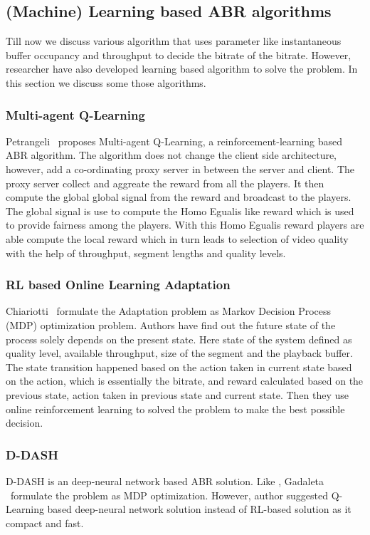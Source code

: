 \subsection{(Machine) Learning based ABR algorithms}
Till now we discuss various algorithm that uses parameter like instantaneous buffer occupancy and throughput to decide the bitrate of the bitrate. However, researcher have also developed learning based algorithm to solve the problem. In this section we discuss some those algorithms.

\subsubsection{Multi-agent Q-Learning}
Petrangeli \etal\ proposes Multi-agent Q-Learning\cite{6838245}, a reinforcement-learning based ABR algorithm. The algorithm does not change the client side architecture, however, add a co-ordinating proxy server in between the server and client. The proxy server collect and aggreate the reward from all the players. It then compute the global global signal from the reward and broadcast to the players. The global signal is use to compute the Homo Egualis \cite{10.5555/1402298.1402344} like reward which is used to provide fairness among the players. With this Homo Egualis reward players are able compute the local reward which in turn leads to selection of video quality with the help of throughput, segment lengths and quality levels.

\subsubsection{RL based Online Learning Adaptation}
Chiariotti \etal\ formulate the Adaptation problem as Markov Decision Process (MDP)\cite{P-1066} optimization problem\cite{10.1145/2910017.2910603}. Authors have find out the future state of the process solely depends on the present state. Here state of the system defined as quality level, available throughput, size of the segment and the playback buffer. The state transition happened based on the action taken in current state based on the action, which is essentially the bitrate, and reward calculated based on the previous state, action taken in previous state and current state. Then they use online reinforcement learning to solved the problem to make the best possible decision.

\subsubsection{D-DASH \cite{8048013}}
D-DASH\cite{8048013} is an deep-neural network based ABR solution. Like \cite{10.1145/2910017.2910603}, Gadaleta \etal\ formulate the problem as MDP optimization. However, author suggested Q-Learning based deep-neural network solution instead of RL-based solution as it compact and fast.

